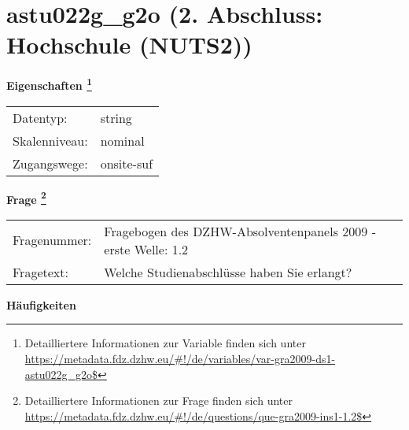 
    \setcounter{footnote}{0}

    \vspace*{-1.8cm}
	\section{astu022g\_g2o (2. Abschluss: Hochschule (NUTS2))}
	\label{section:astu022g_g2o}



    \vspace*{0.5cm}
    \noindent\textbf{Eigenschaften
	\footnote{Detailliertere Informationen zur Variable finden sich unter
		\url{https://metadata.fdz.dzhw.eu/\#!/de/variables/var-gra2009-ds1-astu022g_g2o$}}}\\
	\begin{tabularx}{\hsize}{@{}lX}
	Datentyp: & string \\
	Skalenniveau: & nominal \\
	Zugangswege: &
	  onsite-suf
 \\
    \end{tabularx}



				\vspace*{0.5cm}
                \noindent\textbf{Frage
	                \footnote{Detailliertere Informationen zur Frage finden sich unter
		              \url{https://metadata.fdz.dzhw.eu/\#!/de/questions/que-gra2009-ins1-1.2$}}}\\
				\begin{tabularx}{\hsize}{@{}lX}
					Fragenummer: &
					  Fragebogen des DZHW-Absolventenpanels 2009 - erste Welle:
					  1.2
 \\
					Fragetext: & Welche Studienabschlüsse haben Sie erlangt? \\
				\end{tabularx}





        		\vspace*{0.5cm}
                \noindent\textbf{Häufigkeiten}

